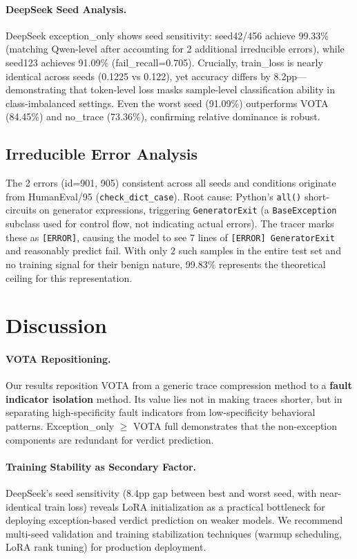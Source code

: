 \documentclass[11pt,a4paper]{article}
\begin{document}
\paragraph{DeepSeek Seed Analysis.} DeepSeek exception\_only shows seed sensitivity: seed42/456 achieve 99.33\% (matching Qwen-level after accounting for 2 additional irreducible errors), while seed123 achieves 91.09\% (fail\_recall=0.705). Crucially, train\_loss is nearly identical across seeds (0.1225 vs 0.122), yet accuracy differs by 8.2pp---demonstrating that token-level loss masks sample-level classification ability in class-imbalanced settings. Even the worst seed (91.09\%) outperforms VOTA (84.45\%) and no\_trace (73.36\%), confirming relative dominance is robust.

\subsection{Irreducible Error Analysis}

The 2 errors (id=901, 905) consistent across all seeds and conditions originate from HumanEval/95 (\texttt{check\_dict\_case}). Root cause: Python's \texttt{all()} short-circuits on generator expressions, triggering \texttt{GeneratorExit} (a \texttt{BaseException} subclass used for control flow, not indicating actual errors). The tracer marks these as \texttt{[ERROR]}, causing the model to see 7 lines of \texttt{[ERROR] GeneratorExit} and reasonably predict fail. With only 2 such samples in the entire test set and no training signal for their benign nature, 99.83\% represents the theoretical ceiling for this representation.

\section{Discussion}

\paragraph{VOTA Repositioning.} Our results reposition VOTA from a generic trace compression method to a \textbf{fault indicator isolation} method. Its value lies not in making traces shorter, but in separating high-specificity fault indicators from low-specificity behavioral patterns. Exception\_only $\geq$ VOTA full demonstrates that the non-exception components are redundant for verdict prediction.

\paragraph{Training Stability as Secondary Factor.} DeepSeek's seed sensitivity (8.4pp gap between best and worst seed, with near-identical train loss) reveals LoRA initialization as a practical bottleneck for deploying exception-based verdict prediction on weaker models. We recommend multi-seed validation and training stabilization techniques (warmup scheduling, LoRA rank tuning) for production deployment.
\end{document}
